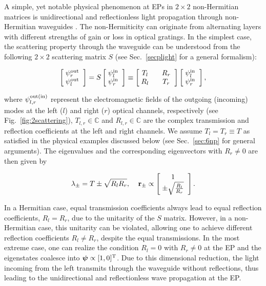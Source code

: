 \documentclass{tADP2e}
\theoremstyle{plain}
\newcommand{\eqn}[1]{
\begin{eqnarray}
	#1
\end{eqnarray}
}
\theoremstyle{plain}
\theoremstyle{definition}
\begin{document}
{A simple, yet notable physical phenomenon at EPs in $2\times 2$ non-Hermitian matrices is unidirectional and reflectionless light propagation through non-Hermitian waveguides \cite{MK05,AM09,LZ11,Longhi_2011,MMA12,CG132}. The non-Hermiticity can originate from alternating layers with different strengths of gain or loss in optical gratings.
In the simplest case, the scattering property through the waveguide can be understood from the following $2\times 2$ scattering matrix $S$ (see Sec.~\ref{secplight} for a general formalism):
\eqn{\label{epsca}
\begin{bmatrix}
\;\psi_{r}^{\rm out}\;\;\\
\;\psi_{l}^{\rm out}\;\;
\end{bmatrix}
=S
\begin{bmatrix}
\;\psi_{l}^{\rm in}\;\;\\
\;\psi_{r}^{\rm in}\;\;
\end{bmatrix}
\equiv
\begin{bmatrix}
\;T_l\; & \;\;R_{r}\;\; \\
\;R_{l}\; & \;\;T_r\;\; \\
\end{bmatrix}
\begin{bmatrix}
\;\psi_{l}^{\rm in}\;\;\\
\;\psi_{r}^{\rm in}\;\;
\end{bmatrix},
}
where $\psi_{l,r}^{\rm out (in)}$ represent the electromagnetic fields of the outgoing (incoming) modes at the left ($l$) and right ($r$) optical channels, respectively (see Fig.~\ref{fig:2scattering}), $T_{l,r}\in\mathbb{C}$ and $R_{l,r}\in\mathbb{C}$ are the complex transmission and reflection coefficients at the left and right channels. We assume $T_{l}=T_r\equiv T$ as satisfied in the physical examples discussed below (see Sec.~\ref{sec:6np} for general arguments). The eigenvalues and the corresponding eigenvectors with $R_r\neq 0$ are then given by
\eqn{
\lambda_{\pm}=T\pm\sqrt{R_{l}R_{r}},\;\;\;\;{\bf r}_{\pm}\propto
\begin{bmatrix}
\;1\;\;\\
\;\pm\sqrt{\frac{R_l}{R_r}}\;\;
\end{bmatrix}.
}
In a Hermitian case, equal transmission coefficients always lead to equal reflection coefficients, $R_l=R_r$, due to the unitarity of the $S$ matrix. However, in a non-Hermitian case, this unitarity can be violated, allowing one to achieve different reflection coefficients $R_l\neq R_r$, despite the equal transmissions. In the most extreme case, one can realize the condition $R_l=0$ with $R_r\neq 0$ at the EP and the eigenstates coalesce into $\boldsymbol{\psi}\propto[1,0]^{\rm T}$. Due to this dimensional reduction, the light incoming from the left transmits through the waveguide without reflections, thus leading to the unidirectional and reflectionless wave propagation at the EP. 

}
\end{document}
